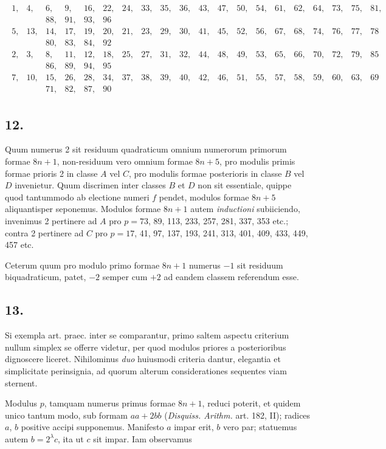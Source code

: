 \documentclass[twoside,12pt]{memoir}
\begin{document}
\[\begin{aligned}
\begin{array}{|rrrrrrrrrrrrrrrrrrrrrr}
1,&4,&6,&9,&16,&22,&24,&33,&35,&36,&43,&47,&50,&54,&61,&62,&64,&73,&75,&81,\\
&&88,&91,&93,&96 \\ 
5,&13,&14,& 17,&19,&20,&21,&23,&29,&30,&41,&45,&52,&56,&67,&68,&74,&76,&77,&78 \\ 
&&80,&83,&84,&92 \\
2,& 3,& 8,&11,&12,&18,&25,&27,&31,&32,&44,&48,&49,&53,&65,&66,&70,&72,&79,&85 \\ 
&&86,&89,&94,&95\\
7,&10,&15,&26,&28,&34,& 37,&38,&39,&40,&42,&46,&51,&55,&57,&58,&59,&60,&63,&69 \\
&&71,&82,&87,&90
\end{array} 
\end{aligned}\]

\subsection*{12.}
 
Quum numerus 2 sit residuum quadraticum omnium numerorum primorum formae \(8 n+1\), non-residuum vero omnium formae \(8 n+5\), pro modulis primis formae prioris 2 in classe \(A\) vel \(C\), pro modulis formae posterioris in classe \(B\) vel \(D\) invenietur. Quum discrimen inter classes \(B\) et \(D\) non sit essentiale, quippe quod tantummodo ab electione numeri \(f\) pendet, modulos formae \(8 n+5\) aliquantisper seponemus. Modulos formae \(8 n+1\) autem \textit{inductioni} subiiciendo, invenimus 2 pertinere ad \(A\) pro \(p=73\), 89, 113, 233, 257, 281, 337, 353 etc.; contra 2 pertinere ad \(C\) pro \(p=17\), 41, 97, 137, 193, 241, 313, 401, 409, 433, 449, 457 etc.
 
Ceterum quum pro modulo primo formae \(8 n+1\) numerus \(-1\) sit residuum biquadraticum, patet, \(-2\) semper cum \(+2\) ad eandem classem referendum esse.\pagebreak%

\subsection*{13.}
 
Si exempla art. praec. inter se comparantur, primo saltem aspectu criterium nullum simplex se offerre videtur, per quod modulos priores a posterioribus dignoscere liceret. Nihilominus \textit{duo} huiusmodi criteria dantur, elegantia et simplicitate perinsignia, ad quorum alterum considerationes sequentes viam sternent.

Modulus \(p\), tamquam numerus primus formae \(8 n+1\), reduci poterit, et quidem unico tantum modo, sub formam \(a a+2 b b\) (\textit{Disquiss. Arithm.} art. 182, II); radices \(a\), \(b\) positive accipi supponemus. Manifesto \(a\) impar erit, \(b\) vero par; statuemus autem \(b=2^{\lambda} c\), ita ut \(c\) sit impar. Iam observamus
 
\end{document}
